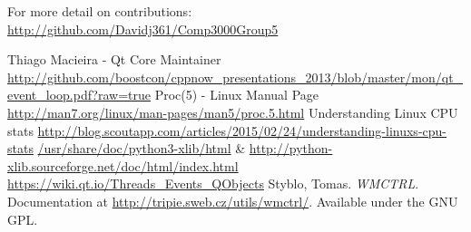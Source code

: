 \documentclass[12pt]{article}
\begin{document}
\hfill\break
For more detail on contributions: \url{http://github.com/Davidj361/Comp3000Group5}
	
	
	
	\begin{thebibliography}{3}
	 Thiago Macieira - Qt Core Maintainer \url{http://github.com/boostcon/cppnow_presentations_2013/blob/master/mon/qt_event_loop.pdf?raw=true}
	 Proc(5) - Linux Manual Page
	\url{http://man7.org/linux/man-pages/man5/proc.5.html}
	 Understanding Linux CPU stats \url{http://blog.scoutapp.com/articles/2015/02/24/understanding-linuxs-cpu-stats}
	 \url{/usr/share/doc/python3-xlib/html} \& \url{http://python-xlib.sourceforge.net/doc/html/index.html}
	 \url{https://wiki.qt.io/Threads_Events_QObjects}
	Styblo, Tomas. \emph{WMCTRL}. Documentation at \url{http://tripie.sweb.cz/utils/wmctrl/}. Available under the GNU GPL.
	\end{thebibliography}
\end{document}
